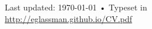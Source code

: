 \documentclass[10pt, a4paper]{article}
\begin{document}
\vfill{}

\begin{center}
{\scriptsize  Last updated: \today\- •\- 
Typeset in \href{http://nitens.org/taraborelli/cvtex}{
\XeTeX }\\
\href{http://eglassman.github.io/CV.pdf}{http://eglassman.github.io/CV.pdf}}
\end{center}
\end{document}
